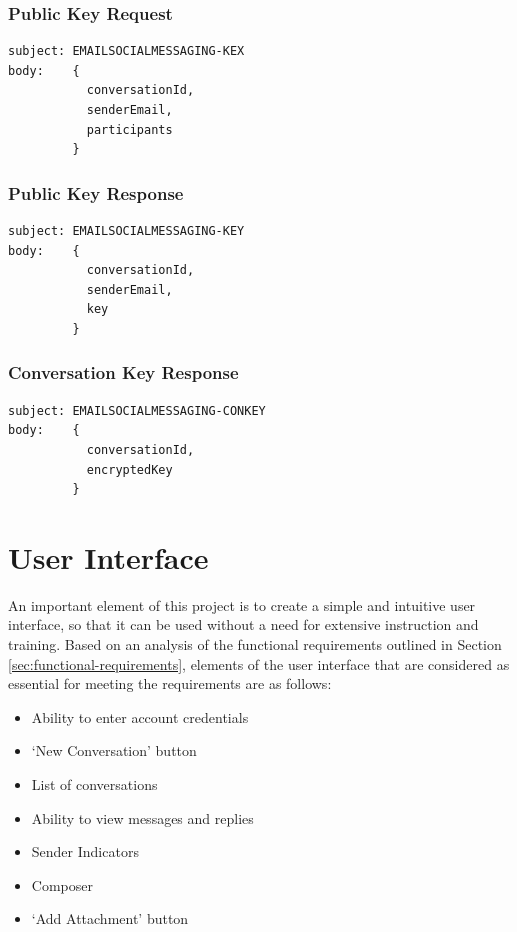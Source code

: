 \subsubsection{Public Key Request}
\begin{verbatim}
subject: EMAILSOCIALMESSAGING-KEX
body:    {
           conversationId,
           senderEmail,
           participants
         }
\end{verbatim}

\subsubsection{Public Key Response}
\begin{verbatim}
subject: EMAILSOCIALMESSAGING-KEY
body:    {
           conversationId,
           senderEmail,
           key
         }
\end{verbatim}

\subsubsection{Conversation Key Response}
\begin{verbatim}
subject: EMAILSOCIALMESSAGING-CONKEY
body:    {
           conversationId,
           encryptedKey
         }
\end{verbatim}

\section{User Interface}

An important element of this project is to create a simple and intuitive user interface, so that it can be used without a need for extensive instruction and training. Based on an analysis of the functional requirements outlined in Section \ref{sec:functional-requirements}, elements of the user interface that are considered as essential for meeting the requirements are as follows:
\begin{itemize}
  \item Ability to enter account credentials
  \item `New Conversation' button
  \item List of conversations
  \item Ability to view messages and replies
  \item Sender Indicators
  \item Composer
  \item `Add Attachment' button
\end{itemize}


